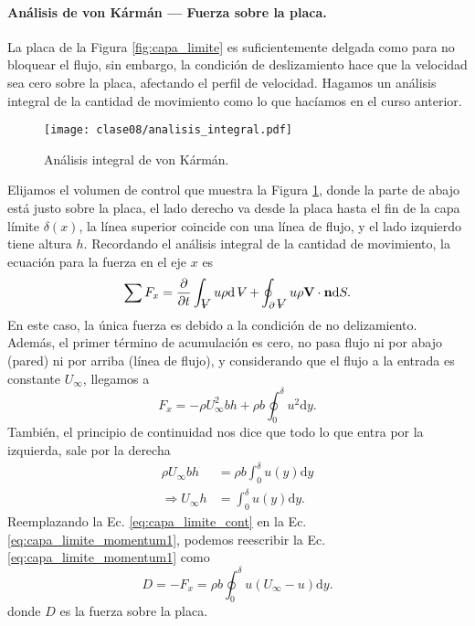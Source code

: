 \paragraph*{Análisis de von Kármán --- Fuerza sobre la placa.}
La placa de la Figura \ref{fig:capa_limite} es suficientemente delgada como para no bloquear el flujo, sin embargo, la condición de deslizamiento hace que la velocidad sea cero sobre la placa, afectando el perfil de velocidad.
Hagamos un análisis integral de la cantidad de movimiento como lo que hacíamos en el curso anterior.
%
\begin{figure}[!h]
\centering
\texttt{[image: clase08/analisis\_integral.pdf]}
\caption{Análisis integral de von Kármán.}
\label{fig:analisis_integral}
\end{figure}
%
Elijamos el volumen de control que muestra la Figura \ref{fig:analisis_integral}, donde la parte de abajo está justo sobre la placa, el lado derecho va desde la placa hasta el fin de la capa límite $\delta(x)$, la línea superior coincide con una línea de flujo, y el lado izquierdo tiene altura $h$.
Recordando el análisis integral de la cantidad de movimiento, la ecuación para la fuerza en el eje $x$ es
%
\begin{equation}
\sum F_x = \frac{\partial}{\partial t} \int_{\vol} u\rho \mathrm{d}\vol + \oint_{\partial\vol} u\rho\mathbf{V}\cdot\mathbf{n}\mathrm{d}S.
\end{equation}
%
En este caso, la única fuerza es debido a la condición de no delizamiento. Además, el primer término de acumulación es cero, no pasa flujo ni por abajo (pared) ni por arriba (línea de flujo), y considerando que el flujo a la entrada es constante $U_\infty$, llegamos a
%
\begin{equation}\label{eq:capa_limite_momentum1}
F_x = -\rho U_\infty^2 bh + \rho b \oint_0^\delta u^2\mathrm{d}y.
\end{equation}
%
También, el principio de continuidad nos dice que todo lo que entra por la izquierda, sale por la derecha
%
\begin{align}\label{eq:capa_limite_cont}
\rho U_\infty bh &= \rho b \int_0^\delta u(y)\mathrm{d}y \nonumber\\
\Rightarrow U_\infty h &= \int_0^\delta u(y)\mathrm{d}y.
\end{align}
%
Reemplazando la Ec. \eqref{eq:capa_limite_cont} en la Ec. \eqref{eq:capa_limite_momentum1}, podemos reescribir la Ec. \eqref{eq:capa_limite_momentum1} como
%
\begin{equation}\label{eq:capa_limite_momentum}
D = -F_x = \rho b \oint_0^\delta u(U_\infty - u)\mathrm{d}y.
\end{equation}
%
donde $D$ es la fuerza sobre la placa.

